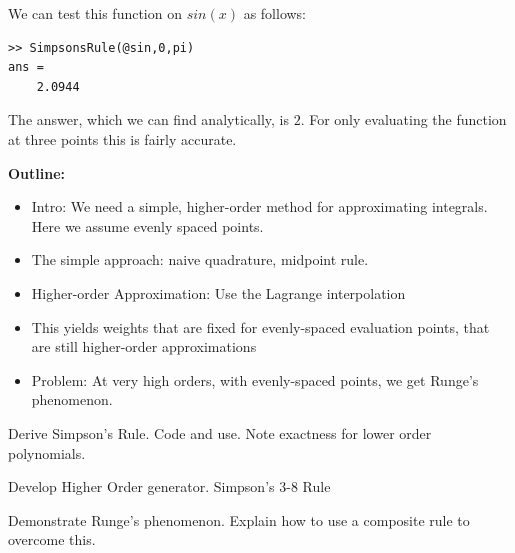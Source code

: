 We can test this function on $sin(x)$ as follows:
\begin{matlab}
\begin{lstlisting}[style=matlab]
>> SimpsonsRule(@sin,0,pi)
ans =
    2.0944
\end{lstlisting}
\end{matlab}

The answer, which we can find analytically, is $2$. For only evaluating the function at three points this is fairly accurate.

{\bf Outline:}
\begin{itemize}
\item Intro: We need a simple, higher-order method for approximating integrals. Here we assume evenly spaced points.
\item The simple approach: naive quadrature, midpoint rule.
\item Higher-order Approximation: Use the Lagrange interpolation
\item This yields weights that are fixed for evenly-spaced evaluation points, that are still higher-order approximations
\item Problem: At very high orders, with evenly-spaced points, we get Runge's phenomenon.
\end{itemize}

\begin{problem}
Derive Simpson's Rule. Code and use. Note exactness for lower order polynomials.
\end{problem}

\begin{problem}
Develop Higher Order generator. Simpson's 3-8 Rule
\end{problem}

\begin{problem}
Demonstrate Runge's phenomenon. Explain how to use a composite rule to overcome this.
\end{problem}
